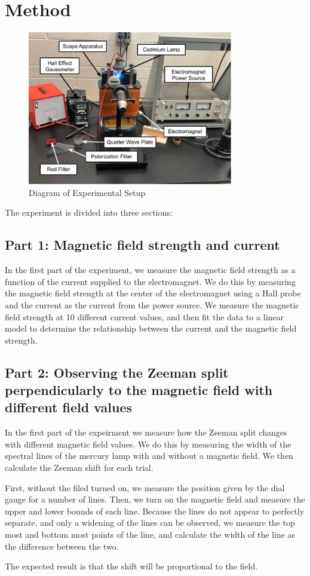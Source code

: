 \section{Method}
\label{sec:method}

\begin{figure}
    \centering
    \includegraphics[width=0.8\textwidth]{method/labeled_diagram.jpg}
    \caption{Diagram of Experimental Setup}
    \label{fig:exp_setup}
\end{figure}

The experiment is divided into three sections:

\subsection{Part 1: Magnetic field strength and current}
In the first part of the experiment, we measure the magnetic field strength as a function of the current supplied to the electromagnet. We do this by measuring the magnetic field strength at the center of the electromagnet using a Hall probe and the current as the current from the power source. We measure the magnetic field strength at 10 different current values, and then fit the data to a linear model to determine the relationship between the current and the magnetic field strength.

\subsection{Part 2: Observing the Zeeman split perpendicularly to the magnetic field with different field values}

In the first part of the expeirment we measure how the Zeeman split changes with different magnetic field values.
We do this by measuring the width of the spectral lines of the mercury lamp with and without a magnetic field.
We then calculate the Zeeman shift for each trial.

First, without the filed turned on, we measure the position given by the dial gauge for a number of lines.
Then, we turn on the magnetic field and measure the upper and lower bounds of each line. Because
the lines do not appear to perfectly separate, and only a widening of the lines can be observed,
we measure the top most and bottom most points of the line, and calculate the width of the line as the difference between the two.

The expected result is that the shift will be proportional to the field.